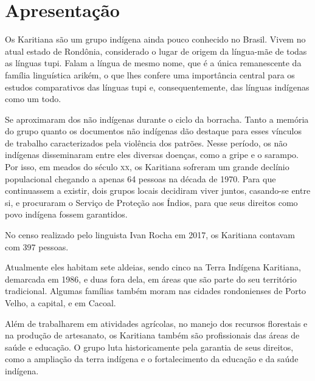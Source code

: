 \chapter{Apresentação}

Os Karitiana são um grupo indígena ainda pouco conhecido no Brasil. Vivem no atual estado de Rondônia, considerado o lugar de origem da
língua-mãe de todas as línguas tupi. Falam a língua de
mesmo nome, que é a única remanescente da família linguística arikém, o
que lhes confere uma importância central para os estudos comparativos
das línguas tupi e, consequentemente, das línguas indígenas como um
todo.

Se aproximaram dos não indígenas durante o ciclo da
borracha. Tanto a memória do grupo quanto os documentos não indígenas dão
destaque para esses vínculos de trabalho caracterizados pela violência
dos patrões. Nesse período, os não indígenas disseminaram entre eles
diversas doenças, como a gripe e o sarampo. Por isso, em meados do
século \textsc{xx}, os Karitiana sofreram um grande declínio populacional 
chegando a apenas 64 pessoas na década de 1970. Para que continuassem a
existir, dois grupos locais decidiram viver juntos, casando-se entre si,
e procuraram o Serviço de Proteção aos Índios, para que seus direitos
como povo indígena fossem garantidos.

No censo realizado pelo linguista Ivan Rocha em 2017, os Karitiana
contavam com 397 pessoas.

Atualmente eles habitam sete aldeias, sendo cinco na Terra Indígena
Karitiana, demarcada em 1986, e duas fora dela, em áreas que são parte
do seu território tradicional. Algumas famílias também moram nas cidades
rondonienses de Porto Velho, a capital, e em Cacoal.

Além de trabalharem em atividades agrícolas, no manejo dos recursos
florestais e na produção de artesanato, os Karitiana também são
profissionais das áreas de saúde e educação. O grupo luta historicamente
pela garantia de seus direitos, como a ampliação da terra indígena e o
fortalecimento da educação e da saúde indígena.